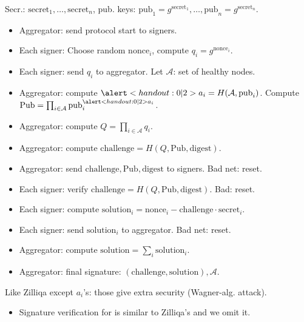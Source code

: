 \begin{frame}
Secr.: $\mathrm{secret}_1, \dots, \mathrm{secret}_n$, pub. keys: $\mathrm{pub}_1 = g^{ \mathrm{secret }_1 }, \dots, \mathrm{pub}_n= g^{\mathrm{secret}_n}$.
\begin{emptyTheorem}
\begin{itemize}
\item Aggregator: send protocol start to signers.
\item Each signer: Choose random $\mathrm{nonce}_i$, compute $q_i = g^{\mathrm{nonce}_i}$.
\item Each signer: send $q_i$ to aggregator. Let $\mathcal A$: set of healthy nodes.
\item Aggregator: compute $\alertNoH{2}{a_i= H(\mathcal A, \mathrm{pub}_i)}$. Compute $ \mathrm{Pub} =\prod_{i\in \mathcal A} \mathrm{pub}_i^{\alertNoH{2}{a_i}}$. 
\item Aggregator: compute $Q = \prod_{i \in \mathcal A} q_i$.
\item Aggregator: compute  $\mathrm{challenge} = H(Q, \mathrm{Pub}, \mathrm{digest})$.
\item Aggregator: send $\mathrm{challenge},\mathrm{Pub}, \mathrm{digest}$ to signers. Bad net: reset.
\item Each signer: verify $\mathrm{challenge} = H(Q, \mathrm {Pub}, \mathrm{digest}) $. Bad: reset.
\item Each signer: compute $\mathrm{solution}_i = {\mathrm{nonce}_i - \mathrm{challenge} \cdot \mathrm{secret}_i} $.
\item Each signer: send $\mathrm{solution}_i$ to aggregator. Bad net: reset.
\item Aggregator: compute $\mathrm{solution} = \sum_i \mathrm{solution}_i $.
\item Aggregator: final signature: $(\mathrm{challenge}, \mathrm{solution}), \mathcal A$.
\end{itemize}
\end{emptyTheorem}
\vskip -0.15cm
Like Zilliqa except $a_i$'s: those give extra security (Wagner-alg. attack).

\vskip 15cm

\end{frame}

\begin{frame}
\begin{itemize}
\item Signature verification for \cite{cryptoeprintSimpleSchnorrMultisignatures} is similar to Zilliqa's and we omit it.
\end{itemize}
\end{frame}


